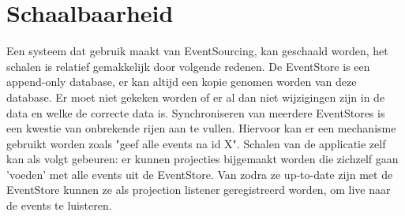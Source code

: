 
\chapter{Schaalbaarheid}
\label{ch:schaalbaarheid}

Een systeem dat gebruik maakt van EventSourcing, kan geschaald worden, het schalen is relatief gemakkelijk door volgende redenen.
De EventStore is een append-only database, er kan altijd een kopie genomen worden van deze database. Er moet niet gekeken worden of er al dan niet wijzigingen zijn in de data en welke de correcte data is. Synchroniseren van meerdere EventStores is een kwestie van onbrekende rijen aan te vullen. Hiervoor kan er een mechanisme gebruikt worden zoals "geef alle events na id X".
Schalen van de applicatie zelf kan als volgt gebeuren: er kunnen projecties bijgemaakt worden die zichzelf gaan 'voeden' met alle events uit de EventStore. Van zodra ze up-to-date zijn met de EventStore kunnen ze als projection listener geregistreerd worden, om live naar de events te luisteren.